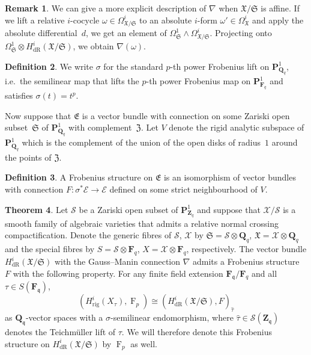 \documentclass[a4paper,11pt]{article}
\numberwithin{equation}{section}
\newcommand{\ZZ}{\mathbf{Z}} %
\newcommand{\QQ}{\mathbf{Q}} %
\newcommand{\FF}{\mathbf{F}} %
\DeclareMathOperator{\Frob}{F}           %
\providecommand{\HdR}{H_{\text{dR}}}    %
\providecommand{\Hrig}{H_{\text{rig}}}  %
\theoremstyle{definition}
\newtheorem{thm}{Theorem}[section]
\newtheorem{defn}[thm]{Definition}
\newtheorem{rem}[thm]{Remark}
\begin{document}
\begin{rem}
We can give a more explicit description of $\nabla$ when 
$\mathfrak{X}/\mathfrak{S}$ is affine. If we lift a relative $i$-cocycle 
$\omega \in \Omega^i_{\mathfrak{X}/\mathfrak{S}}$ to an absolute $i$-form 
$\omega' \in \Omega^i_{\mathfrak{X}}$ and apply the absolute differential~$d$, 
we get an element of 
$\Omega^1_{\mathfrak{S}} \wedge \Omega^i_{\mathfrak{X}/\mathfrak{S}}$. 
Projecting onto 
$\Omega^1_{\mathfrak{S}} \otimes \HdR^i(\mathfrak{X}/\mathfrak{S})$, 
we obtain $\nabla(\omega)$. 
\end{rem}

\begin{defn} \label{defn:sigma}
We write $\sigma$ for the standard $p$-th power Frobenius lift on 
$\mathbf{P}^1_{\QQ_q}$, i.e.\ the semilinear map that lifts the $p$-th power 
Frobenius map on $\mathbf{P}^1_{\FF_q}$ and satisfies $\sigma(t)=t^p$. 
\end{defn}

Now suppose that $\mathfrak{E}$ is a vector bundle with connection on 
some Zariski open subset~$\mathfrak{S}$ of $\mathbf{P}^1_{\QQ_q}$ with 
complement~$\mathfrak{Z}$. Let $V$ denote the rigid analytic subspace 
of $\mathbf{P}^1_{\QQ_q}$ which is the complement of the union of the 
open disks of radius~$1$ around the points of $\mathfrak{Z}$.

\begin{defn}
A Frobenius structure on $\mathfrak{E}$ is an isomorphism of vector bundles 
with connection $F \colon \sigma^* \mathcal{E} \rightarrow \mathcal{E}$ 
defined on some strict neighbourhood of $V$. 
\end{defn}

\begin{thm} \label{thm:frobstruc}
Let $\mathcal{S}$ be a Zariski open subset of $\mathbf{P}^1_{\ZZ_q}$ and 
suppose that $\mathcal{X}/\mathcal{S}$ is a smooth family of algebraic 
varieties that admits a relative normal crossing compactification. Denote 
the generic fibres of $\mathcal{S}$, $\mathcal{X}$ by 
$\mathfrak{S}=\mathcal{S} \otimes \QQ_q$, $\mathfrak{X}=\mathcal{X} \otimes \QQ_q$ 
and the special fibres by $S=\mathcal{S} \otimes \FF_q$, 
$X=\mathcal{X} \otimes \FF_q$, respectively. The vector bundle 
$\HdR^i(\mathfrak{X}/\mathfrak{S})$ with the Gauss--Manin connection $\nabla$ 
admits a Frobenius structure $F$ with the following property. 
For any finite field extension $\FF_{\mathfrak{q}}/\FF_q$ and
all $\tau \in S(\FF_{\mathfrak{q}})$,
\[
(\Hrig^i(X_{\tau}),\Frob_p) \cong (\HdR^i(\mathfrak{X}/\mathfrak{S}),F)_{\hat{\tau}}
\] 
as $\QQ_{\mathfrak{q}}$-vector spaces with a $\sigma$-semilinear 
endomorphism, where $\hat{\tau} \in \mathcal{S}(\ZZ_{\mathfrak{q}})$ denotes 
the Teichm\"uller lift of $\tau$. We will therefore denote this Frobenius 
structure on $\HdR^i(\mathfrak{X}/\mathfrak{S})$ by $\Frob_p$ as well.
\end{thm}
\end{document}
